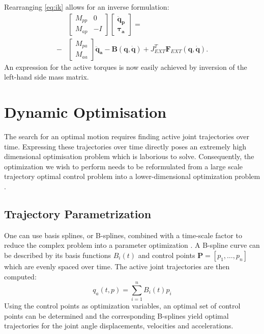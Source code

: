 \documentclass[letterpaper, 10 pt, conference]{ieeeconf}  %
\begin{document}
Rearranging \eqref{eq:ik} allows for an inverse formulation:
\begin{equation}
\begin{aligned}
&\left[\begin{array}{cc}  
M_{pp} & 0\\
M_{ap} &-I
\end{array} \right]
\left[\begin{array}{c}  
\mathbf{\ddot q_p}\\
\boldsymbol{\tau_a}
\end{array} \right] =\\ 
-&
\left[\begin{array}{c}  
M_{pa}\\
M_{aa}
\end{array} \right] 
\mathbf{\ddot q_a}-
\mathbf{B(q, \dot q)}+
J_{EXT}^T\mathbf{F}_{EXT}\mathbf{(q, \dot q)}.
\end{aligned}
\end{equation}	
An expression for the active torques is now easily achieved by inversion of the left-hand side mass matrix. 

\section{Dynamic Optimisation} \label{sec:dynamicOptimisation}

The search for an optimal motion requires finding active joint trajectories over time. Expressing these trajectories over time directly poses an extremely high dimensional optimisation problem which is laborious to solve. Consequently, the optimization we wish to perform needs to be reformulated from a large scale trajectory optimal control problem into a lower-dimensional optimization problem \cite{kaphle2008optimality}.


\subsection{Trajectory Parametrization}

One can use basis splines, or B-splines, combined with a time-scale factor to reduce the complex problem into a parameter optimization \cite{ude2000planning} \cite{babivc2009biarticulated} \cite{wang1999weight} \cite{albro2001optimal}. A B-spline curve can be described by its basis functions $B_i(t)$ and control points $\mathbf{P}=\left[p_1,\dots,p_n\right]$ which are evenly spaced over time. The active joint trajectories are then computed:   
 \begin{equation}
q_a(t,p) = \sum_{i=1}^{n} B_i (t) p_i
\end{equation}
Using the control points as optimization variables, an optimal set of control points can be determined and the corresponding B-splines yield optimal trajectories for the joint angle displacements, velocities and accelerations. 
\end{document}
